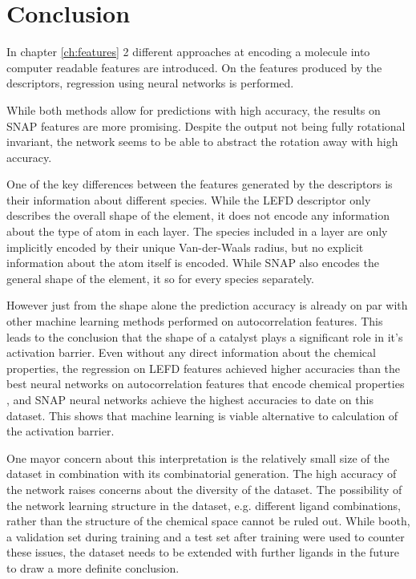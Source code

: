 
\chapter{Conclusion}
\label{ch:Conclusion}
In chapter \ref{ch:features} 2 different approaches at encoding a molecule into computer readable features are introduced.
On the features produced by the descriptors, regression using neural networks is performed.

While both methods allow for predictions with high accuracy, the results on SNAP features are more promising.
Despite the output not being fully rotational invariant, the network seems to be able to abstract the rotation away with high accuracy.

One of the key differences between the features generated by the descriptors is their information about 
different species.
While the LEFD descriptor only describes the overall shape of the element, it does not encode any information about the 
type of atom in each layer.
The species included in a layer are only implicitly encoded by their unique Van-der-Waals radius, but no explicit information about the 
atom itself is encoded.
While SNAP also encodes the general shape of the element, it so for every species separately.

However just from the shape alone the prediction accuracy is already on par with other machine learning methods performed on autocorrelation features.
This leads to the conclusion that the shape of a catalyst plays a significant role in it's activation barrier.
Even without any direct information about the chemical properties, the regression on LEFD features achieved higher accuracies than
the best neural networks on autocorrelation features that encode chemical properties \cite{friederich_dos},
and SNAP neural networks achieve the highest accuracies to date on this dataset.
This shows that machine learning is viable alternative to calculation of the activation barrier.

One mayor concern about this interpretation is the relatively small size of the dataset in combination 
with its combinatorial generation.
The high accuracy of the network raises concerns about the diversity of the dataset.
The possibility of the network learning structure in the dataset, e.g. different ligand combinations,
rather than the structure of the chemical space cannot be ruled out.
While booth, a validation set during training and a test set after training were used to counter these issues,
the dataset needs to be extended with further ligands in the future to draw a more definite conclusion.

